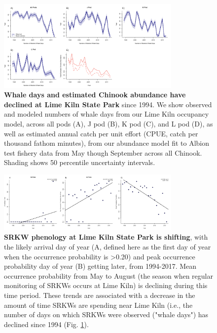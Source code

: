 \documentclass{article}
\begin{document}
\begin{figure}[p]
\includegraphics[width=0.8\textwidth]{../analyses/orcaphen/figures/modwhaledays_lime.png} 
\caption{\textbf{Whale days and estimated Chinook abundance have declined at Lime Kiln State Park} since 1994. We show observed and modeled numbers of whale days from our Lime Kiln occupancy model, across all pods (A), J pod (B), K pod (C), and L pod (D), as well as estimated annual catch per unit effort (CPUE, catch per thousand fathom minutes), from our abundance model fit to Albion test fishery data from May though September across all Chinook. Shading shows 50 percentile uncertainty intervals.}
\label{fig:mlimewdays}
\end{figure}
\begin{figure}[p]
\includegraphics[width=0.8\textwidth]{../analyses/orcaphen/figures/phentrends_lime_peak.png} 
\caption{\textbf{SRKW phenology at Lime Kiln State Park is shifting}, with the likely arrival day of year (A, defined here as the first day of year when the occurrence probability is >0.20) and peak occurrence probability day of year (B) getting later, from 1994-2017. Mean occurrence probability from May to August (the season when regular monitoring of SRKWs occurs at Lime Kiln) is declining during this time period. These trends are associated with a decrease in the amount of time SRKWs are spending near Lime Kiln (i.e., the number of days on which SRKWs were observed ("whale days") has declined since 1994 (Fig. \ref{fig:mlimewdays}).}
\label{fig:limetime}
\end{figure}
\end{document}
